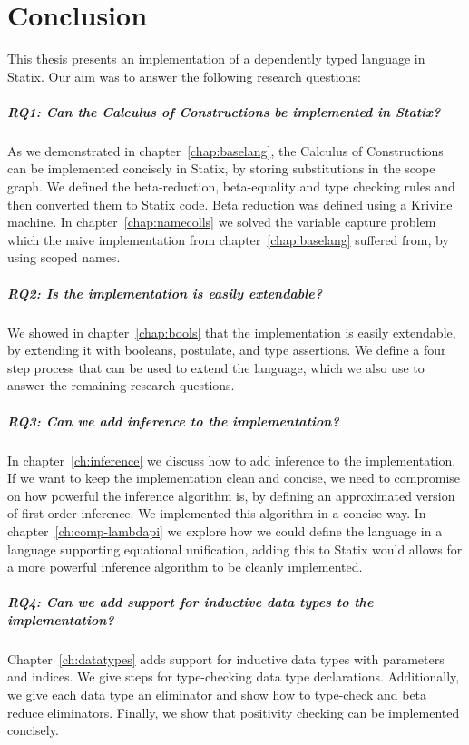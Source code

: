 \chapter{Conclusion}
\label{ch:conclusion}

This thesis presents an implementation of a dependently typed language in Statix. Our aim was to answer the following research questions:

\paragraph{RQ1: Can the Calculus of Constructions be implemented in Statix?}
As we demonstrated in chapter~\ref{chap:baselang}, the Calculus of Constructions can be implemented concisely in Statix, by storing substitutions in the scope graph. We defined the beta-reduction, beta-equality and type checking rules and then converted them to Statix code. Beta reduction was defined using a Krivine machine. In chapter~\ref{chap:namecolls} we solved the variable capture problem which the naive implementation from chapter~\ref{chap:baselang} suffered from, by using scoped names.

\paragraph{RQ2: Is the implementation is easily extendable?}
We showed in chapter~\ref{chap:bools} that the implementation is easily extendable, by extending it with booleans, postulate, and type assertions. We define a four step process that can be used to extend the language, which we also use to answer the remaining research questions.

\paragraph{RQ3: Can we add inference to the implementation?}
In chapter~\ref{ch:inference} we discuss how to add inference to the implementation. If we want to keep the implementation clean and concise, we need to compromise on how powerful the inference algorithm is, by defining an approximated version of first-order inference. We implemented this algorithm in a concise way. In chapter~\ref{ch:comp-lambdapi} we explore how we could define the language in a language supporting equational unification, adding this to Statix would allows for a more powerful inference algorithm to be cleanly implemented.

\paragraph{RQ4: Can we add support for inductive data types to the implementation?}
Chapter~\ref{ch:datatypes} adds support for inductive data types with parameters and indices. We give steps for type-checking data type declarations. Additionally, we give each data type an eliminator and show how to type-check and beta reduce eliminators. Finally, we show that positivity checking can be implemented concisely.


